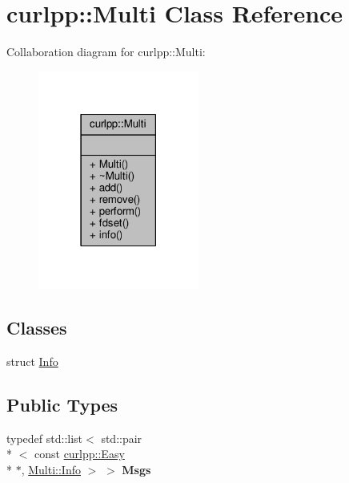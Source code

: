 \hypertarget{classcurlpp_1_1Multi}{\section{curlpp\-:\-:Multi Class Reference}
\label{classcurlpp_1_1Multi}
}


Collaboration diagram for curlpp\-:\-:Multi\-:\nopagebreak
\begin{figure}[H]
\begin{center}
\leavevmode
\includegraphics[width=150pt]{classcurlpp_1_1Multi__coll__graph}
\end{center}
\end{figure}
\subsection*{Classes}
\begin{DoxyCompactItemize}
\item 
struct \hyperlink{structcurlpp_1_1Multi_1_1Info}{Info}
\end{DoxyCompactItemize}
\subsection*{Public Types}
\begin{DoxyCompactItemize}
\item 
\hypertarget{classcurlpp_1_1Multi_ab6a6fa294d6ff593449ae7152ca6d305}{typedef std\-::list$<$ std\-::pair\\*
$<$ const \hyperlink{classcurlpp_1_1Easy}{curlpp\-::\-Easy} \\*
$\ast$, \hyperlink{structcurlpp_1_1Multi_1_1Info}{Multi\-::\-Info} $>$ $>$ {\bfseries Msgs}}\label{classcurlpp_1_1Multi_ab6a6fa294d6ff593449ae7152ca6d305}

\end{DoxyCompactItemize}
